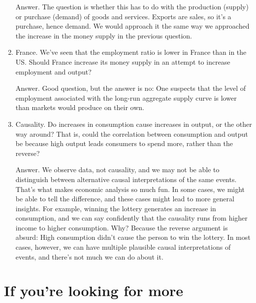 \begin{enumerate}
Answer.  The question is whether this has to do with the production (supply)
or purchase (demand) of goods and services.
Exports are sales, so it's a purchase, hence demand.
We would approach it the same way we approached the increase
in the money supply in the previous question.

%

\item France.
We've seen that the employment ratio is lower in France than in the US.
Should France increase its money supply in an attempt to increase
employment and output?

Answer.  Good question, but the answer is no:
One suspects that the level of employment
associated with the long-run aggregate supply curve is lower than
markets would produce on their own.

\item Causality.
Do increases in consumption cause increases in output,
or the other way around?
That is, could the correlation between consumption and output be because
high output leads consumers to spend more, rather than the reverse?

Answer.  We observe data, not causality,
and we may not be able to distinguish between
alternative causal interpretations of the same events.
That's what makes economic analysis so much fun.
In some cases, we might be able to tell the difference,
and these cases might lead to more general insights.
For example, winning the lottery generates an increase in consumption,
and we can say confidently that the causality runs from
higher income to higher consumption.
Why?  Because the reverse argument is absurd: High consumption didn't cause the person to win the lottery.
In most cases, however,
we can have multiple plausible causal interpretations of events,
and there's not much we can do about it.
\end{enumerate}
\setlength{\leftmargini}{\oldleftmargini}


\section*{If you're looking for more}

